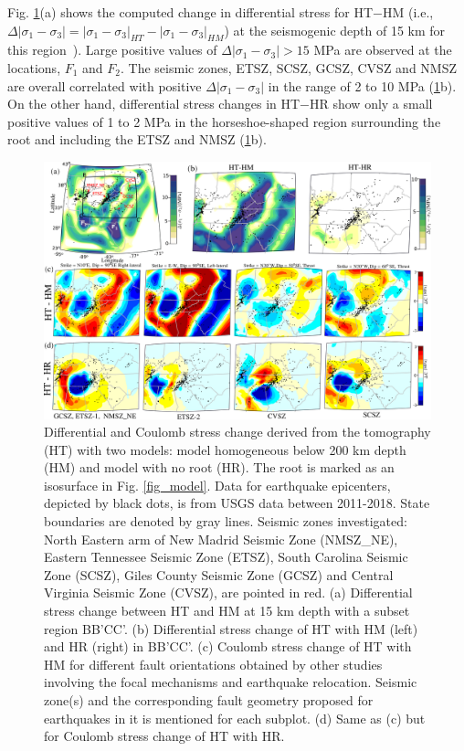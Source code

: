 \documentclass[draft,linenumbers]{agujournal2018}
\begin{document}
Fig. \ref{model_results}(a) shows the computed change in differential stress for HT$-$HM (i.e., $\Delta|\sigma_1 - \sigma_3| = |\sigma_1 - \sigma_3|_{HT} - |\sigma_1 - \sigma_3|_{HM}$) at the seismogenic depth of 15 km for this region~\citep[e.g.,][]{mazzotti2010state}). Large positive values of $\Delta |\sigma_1 - \sigma_3|>15$ MPa are observed at the locations, $F_1$ and $F_2$.  The seismic zones, ETSZ, SCSZ, GCSZ, CVSZ and NMSZ are overall correlated with positive $\Delta |\sigma_1 - \sigma_3|$ in the range of 2 to 10 MPa (\ref{model_results}b). On the other hand, differential stress changes in HT$-$HR show only a small positive values of 1 to 2 MPa in the horseshoe-shaped region surrounding the root and including the ETSZ and NMSZ (\ref{model_results}b).
%
\begin{figure}[H]
    \centering
    \includegraphics[width=\linewidth]{figures/model_results.png}
    \caption{Differential and Coulomb stress change derived from the tomography (HT) with two models: model homogeneous below 200 km depth (HM) and model with no root (HR). The root is marked as an isosurface in Fig. \ref{fig_model}. Data for earthquake epicenters, depicted by black dots, is from USGS data between 2011-2018. State boundaries are denoted by gray lines. Seismic zones investigated: North Eastern arm of New Madrid Seismic Zone (NMSZ\_NE), Eastern Tennessee Seismic Zone (ETSZ), South Carolina Seismic Zone (SCSZ), Giles County Seismic Zone (GCSZ) and Central Virginia Seismic Zone (CVSZ), are pointed in red. (a) Differential stress change between HT and HM at 15 km depth with a subset region BB'CC'. (b) Differential stress change of HT with HM (left) and HR (right) in BB'CC'. (c) Coulomb stress change of HT with HM for different fault orientations obtained by other studies involving the focal mechanisms and earthquake relocation. Seismic zone(s) and the corresponding fault geometry proposed for earthquakes in it is mentioned for each subplot. (d) Same as (c) but for Coulomb stress change of HT with HR. }
    \label{model_results}
\end{figure}
\end{document}
